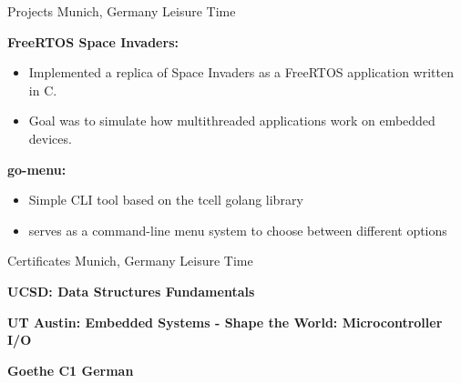 \begin{cventries}
  \cventry
    {} %
    {Projects} %
    {Munich, Germany} %
    {Leisure Time} %
    {
      \begin{cvitems} %
        \item { \textbf{FreeRTOS Space Invaders:}
                \begin{itemize}
                    \item Implemented a replica of Space Invaders as a FreeRTOS application written in C.
                    \item Goal was to simulate how multithreaded applications work on embedded devices.
                \end{itemize}
              }
        \item { \textbf{go-menu:}
                \begin{itemize}
                    \item Simple CLI tool based on the tcell golang library
                    \item serves as a command-line menu system to choose between different options
                \end{itemize}
              }
       \end{cvitems}
    }
  \cventry
    {} %
    {Certificates} %
    {Munich, Germany} %
    {Leisure Time} %
    {
      \begin{cvitems} %
          \vspace{1.5mm}
          \item { \textbf{UCSD: Data Structures Fundamentals} }
          \vspace{1.5mm}
          \item { \textbf{UT Austin: Embedded Systems - Shape the World: Microcontroller I/O} }
          \vspace{1.5mm}
          \item { \textbf{Goethe C1 German} }
       \end{cvitems}
    }
\end{cventries}
